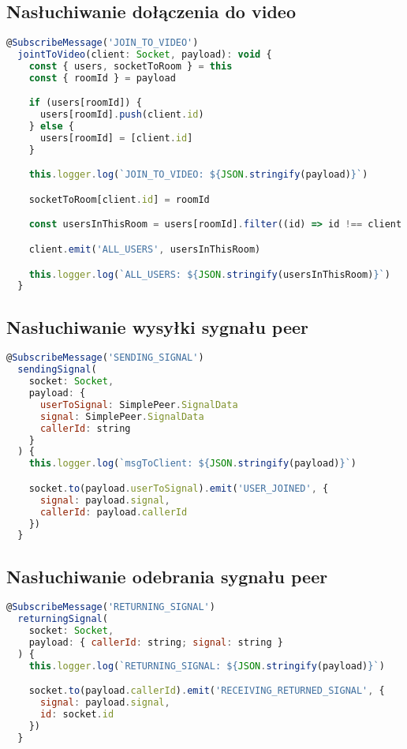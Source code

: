\documentclass{article}
\begin{document}
\subsection{Nasłuchiwanie dołączenia do video}
\begin{lstlisting}[language=JavaScript]
  @SubscribeMessage('JOIN_TO_VIDEO')
  jointToVideo(client: Socket, payload): void {
    const { users, socketToRoom } = this
    const { roomId } = payload

    if (users[roomId]) {
      users[roomId].push(client.id)
    } else {
      users[roomId] = [client.id]
    }

    this.logger.log(`JOIN_TO_VIDEO: ${JSON.stringify(payload)}`)

    socketToRoom[client.id] = roomId

    const usersInThisRoom = users[roomId].filter((id) => id !== client.id)

    client.emit('ALL_USERS', usersInThisRoom)

    this.logger.log(`ALL_USERS: ${JSON.stringify(usersInThisRoom)}`)
  }
\end{lstlisting}

\subsection{Nasłuchiwanie wysyłki sygnału peer}
\begin{lstlisting}[language=JavaScript]
  @SubscribeMessage('SENDING_SIGNAL')
  sendingSignal(
    socket: Socket,
    payload: {
      userToSignal: SimplePeer.SignalData
      signal: SimplePeer.SignalData
      callerId: string
    }
  ) {
    this.logger.log(`msgToClient: ${JSON.stringify(payload)}`)

    socket.to(payload.userToSignal).emit('USER_JOINED', {
      signal: payload.signal,
      callerId: payload.callerId
    })
  }
\end{lstlisting}

\subsection{Nasłuchiwanie odebrania sygnału peer}
\begin{lstlisting}[language=JavaScript]
  @SubscribeMessage('RETURNING_SIGNAL')
  returningSignal(
    socket: Socket,
    payload: { callerId: string; signal: string }
  ) {
    this.logger.log(`RETURNING_SIGNAL: ${JSON.stringify(payload)}`)

    socket.to(payload.callerId).emit('RECEIVING_RETURNED_SIGNAL', {
      signal: payload.signal,
      id: socket.id
    })
  }
\end{lstlisting}
\end{document}
